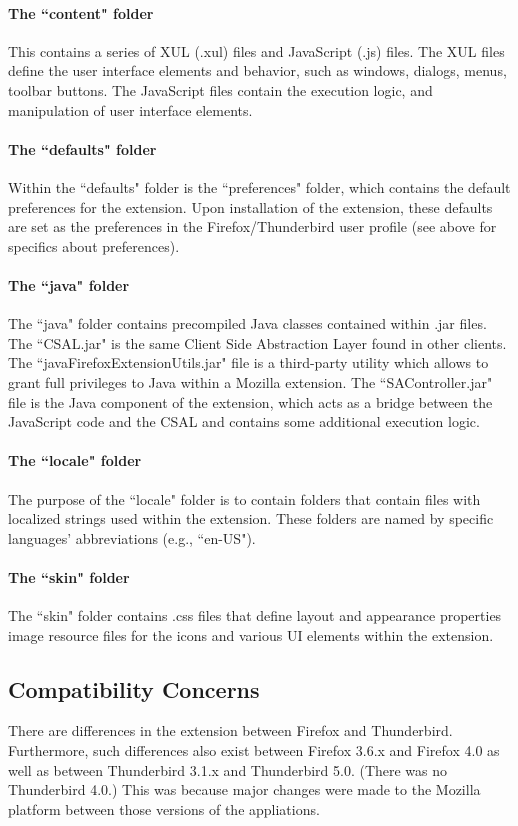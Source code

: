 \paragraph{The ``content" folder} This contains a series of XUL (.xul) files and JavaScript (.js) files. The XUL files define the user interface elements and behavior, such as windows, dialogs, menus, toolbar buttons. The JavaScript files contain the execution logic, and manipulation of user interface elements. 
\paragraph{The ``defaults" folder} Within the ``defaults" folder is the ``preferences" folder, which contains the default preferences for the extension. Upon installation of the extension, these defaults are set as the preferences in the Firefox/Thunderbird user profile (see above for specifics about preferences). 
\paragraph{The ``java" folder} The ``java" folder contains precompiled Java classes contained within .jar files. The ``CSAL.jar" is the same Client Side Abstraction Layer found in other clients. The ``javaFirefoxExtensionUtils.jar" file is a third-party utility which allows to grant full privileges to Java within a Mozilla extension. The ``SAController.jar" file is the Java component of the extension, which acts as a bridge between the JavaScript code and the CSAL and contains some additional execution logic. 
\paragraph{The ``locale" folder} The purpose of the ``locale" folder is to contain folders that contain files with localized strings used within the extension. These folders are named by specific languages' abbreviations (e.g., ``en-US"). 
\paragraph{The ``skin" folder} The ``skin" folder contains .css files that define layout and appearance properties image resource files for the icons and various UI elements within the extension.

\subsection{Compatibility Concerns}
There are differences in the extension between Firefox and Thunderbird. Furthermore, such differences also exist between Firefox 3.6.x and Firefox 4.0 as well as between Thunderbird 3.1.x and Thunderbird 5.0. (There was no Thunderbird 4.0.) This was because major changes were made to the Mozilla platform between those versions of the appliations. 

